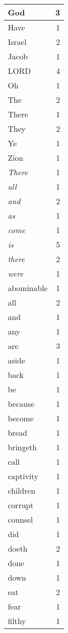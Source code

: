 \begin{center}
\begin{longtable}{l|r}
\hline \hline
\endlastfoot
God & 3 \\ \hline
Have & 1 \\ \hline
Israel & 2 \\ \hline
Jacob & 1 \\ \hline
LORD & 4 \\ \hline
Oh & 1 \\ \hline
The & 2 \\ \hline
There & 1 \\ \hline
They & 2 \\ \hline
Ye & 1 \\ \hline
Zion & 1 \\ \hline
\emph{There} & 1 \\ \hline
\emph{all} & 1 \\ \hline
\emph{and} & 2 \\ \hline
\emph{as} & 1 \\ \hline
\emph{come} & 1 \\ \hline
\emph{is} & 5 \\ \hline
\emph{there} & 2 \\ \hline
\emph{were} & 1 \\ \hline
abominable & 1 \\ \hline
all & 2 \\ \hline
and & 1 \\ \hline
any & 1 \\ \hline
are & 3 \\ \hline
aside & 1 \\ \hline
back & 1 \\ \hline
be & 1 \\ \hline
because & 1 \\ \hline
become & 1 \\ \hline
bread & 1 \\ \hline
bringeth & 1 \\ \hline
call & 1 \\ \hline
captivity & 1 \\ \hline
children & 1 \\ \hline
corrupt & 1 \\ \hline
counsel & 1 \\ \hline
did & 1 \\ \hline
doeth & 2 \\ \hline
done & 1 \\ \hline
down & 1 \\ \hline
eat & 2 \\ \hline
fear & 1 \\ \hline
filthy & 1 \\ \hline

\end{longtable}
\end{center}
